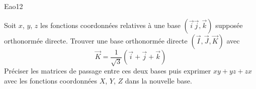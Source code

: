 \begin{tiny}Eao12\end{tiny} Soit $x$, $y$, $z$ les fonctions coordonnées relatives à une base $(\overrightarrow i\overrightarrow j,\overrightarrow k)$ supposée orthonormée directe. Trouver une base orthonormée directe $(\overrightarrow I,\overrightarrow J,\overrightarrow K)$ avec 
\begin{displaymath}
 \overrightarrow K = \frac{1}{\sqrt{3}}(\overrightarrow i+\overrightarrow j+\overrightarrow k)
\end{displaymath}
Préciser les matrices de passage entre ces deux bases puis  exprimer $xy+yz+zx$ avec les fonctions coordonnées $X$, $Y$, $Z$ dans la nouvelle base.
